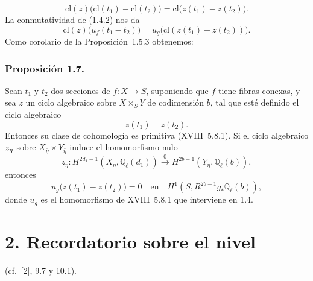 \pageoriginale

\begin{equation}\tag{1.6.8}
\mathrm{cl}(z)\bigl(\mathrm{cl}(t_1)-\mathrm{cl}(t_2)\bigr)
=\mathrm{cl}\bigl(z(t_1)-z(t_2)\bigr).
\end{equation}
La conmutatividad de (1.4.2) nos da
\begin{equation}\tag{1.6.9}
\mathrm{cl}(z)\bigl(u_f(t_1-t_2)\bigr)
=u_g\bigl(\mathrm{cl}(z(t_1)-z(t_2))\bigr).
\end{equation}
Como corolario de la Proposición~1.5.3 obtenemos:

\subsubsection*{Proposición 1.7.}
Sean $t_1$ y $t_2$ dos secciones de $f:X\longrightarrow S$, suponiendo
que $f$ tiene fibras conexas, y sea $z$ un ciclo algebraico sobre
$X\times_S Y$ de codimensión $b$, tal que esté definido el ciclo
algebraico
\begin{equation}\tag{1.7.1}
z(t_1)-z(t_2).
\end{equation}
Entonces su clase de cohomología es primitiva (XVIII~5.8.1). Si el ciclo
algebraico $\sisi{Z_{\bar\eta}}{z_{\bar\eta}}$ sobre
$X_{\bar\eta}\times Y_{\bar\eta}$ induce el homomorfismo nulo
\begin{equation}\tag{1.7.2}
z_{\bar\eta}:H^{2d_1-1}(X_{\bar\eta},\mathbb Q_\ell(d_1))
\stackrel{0}{\longrightarrow}
H^{2b-1}(Y_{\bar\eta},\mathbb Q_\ell(b)),
\end{equation}
entonces
\begin{equation}\tag{1.7.3}
u_g\bigl(z(t_1)-z(t_2)\bigr)=0\quad\text{en}\quad
H^1(S,R^{2b-1}g_*\mathbb Q_\ell(b)),
\end{equation}
donde $u_g$ es el homomorfismo de XVIII~5.8.1 que interviene en 1.4.

\pageoriginale

\section*{2. Recordatorio sobre el nivel}
\noindent(cf.~[2], 9.7 y 10.1).

